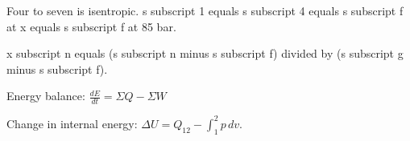 Four to seven is isentropic.  
s subscript 1 equals s subscript 4 equals s subscript f at x equals s subscript f at 85 bar.  

x subscript n equals (s subscript n minus s subscript f) divided by (s subscript g minus s subscript f).

Energy balance:  
\( \frac{dE}{dt} = \Sigma Q - \Sigma W \)  

Change in internal energy:  
\( \Delta U = Q_{12} - \int_{1}^{2} p \, dv \).